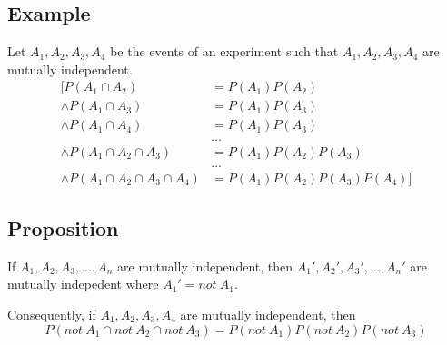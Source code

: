 \documentclass{math}
\begin{document}
\subsection*{Example}
Let \( A_{1}, A_{2}, A_{3}, A_{4} \) be the events of an experiment such that
\( A_{1}, A_{2}, A_{3}, A_{4} \) are mutually independent.
\begin{align*}
  \bigg[P(A_{1} \cap A_{2}) &= P(A_{1})P(A_{2}) \\
  \wedge P(A_{1} \cap A_{3}) &= P(A_{1})P(A_{3}) \\
  \wedge P(A_{1} \cap A_{4}) &= P(A_{1})P(A_{3}) \\
  & \dots \\
  \wedge P(A_{1} \cap A_{2} \cap A_{3}) &= P(A_{1})P(A_{2})P(A_{3}) \\
  & \dots \\
  \wedge P(A_{1} \cap A_{2} \cap A_{3} \cap A_{4}) &=
    P(A_{1})P(A_{2})P(A_{3})P(A_{4}) \bigg]
\end{align*}

\subsection*{Proposition}
If \( A_{1},A_{2},A_{3},\dots,A_{n} \) are mutually independent, then
\( A_{1}',A_{2}',A_{3}',\dots,A_{n}' \) are mutually indepedent where
\( A_{1}' = not\ A_{1} \). \par
Consequently, if \( A_{1},A_{2},A_{3},A_{4} \) are mutually independent, then
\[ P(not\ A_{1} \cap not\ A_{2} \cap not\ A_{3}) =
   P(not\ A_{1})P(not\ A_{2})P(not\ A_{3}) \]
\end{document}
